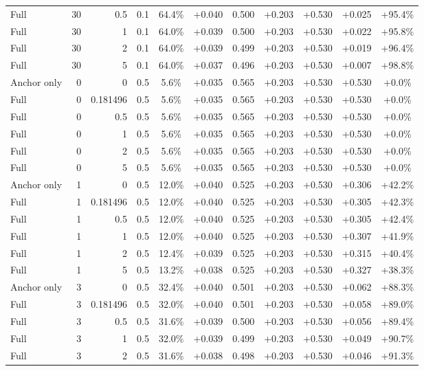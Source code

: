 \begin{table}[htbp]
\begin{tabular}{lrrrccccccc}
Full & 30 & 0.5 & 0.1 & 64.4\% & +0.040 & 0.500 & +0.203 & +0.530 & +0.025 & +95.4\% \\
Full & 30 & 1 & 0.1 & 64.0\% & +0.039 & 0.500 & +0.203 & +0.530 & +0.022 & +95.8\% \\
Full & 30 & 2 & 0.1 & 64.0\% & +0.039 & 0.499 & +0.203 & +0.530 & +0.019 & +96.4\% \\
Full & 30 & 5 & 0.1 & 64.0\% & +0.037 & 0.496 & +0.203 & +0.530 & +0.007 & +98.8\% \\
Anchor only & 0 & 0 & 0.5 & 5.6\% & +0.035 & 0.565 & +0.203 & +0.530 & +0.530 & +0.0\% \\
Full & 0 & 0.181496 & 0.5 & 5.6\% & +0.035 & 0.565 & +0.203 & +0.530 & +0.530 & +0.0\% \\
Full & 0 & 0.5 & 0.5 & 5.6\% & +0.035 & 0.565 & +0.203 & +0.530 & +0.530 & +0.0\% \\
Full & 0 & 1 & 0.5 & 5.6\% & +0.035 & 0.565 & +0.203 & +0.530 & +0.530 & +0.0\% \\
Full & 0 & 2 & 0.5 & 5.6\% & +0.035 & 0.565 & +0.203 & +0.530 & +0.530 & +0.0\% \\
Full & 0 & 5 & 0.5 & 5.6\% & +0.035 & 0.565 & +0.203 & +0.530 & +0.530 & +0.0\% \\
Anchor only & 1 & 0 & 0.5 & 12.0\% & +0.040 & 0.525 & +0.203 & +0.530 & +0.306 & +42.2\% \\
Full & 1 & 0.181496 & 0.5 & 12.0\% & +0.040 & 0.525 & +0.203 & +0.530 & +0.305 & +42.3\% \\
Full & 1 & 0.5 & 0.5 & 12.0\% & +0.040 & 0.525 & +0.203 & +0.530 & +0.305 & +42.4\% \\
Full & 1 & 1 & 0.5 & 12.0\% & +0.040 & 0.525 & +0.203 & +0.530 & +0.307 & +41.9\% \\
Full & 1 & 2 & 0.5 & 12.4\% & +0.039 & 0.525 & +0.203 & +0.530 & +0.315 & +40.4\% \\
Full & 1 & 5 & 0.5 & 13.2\% & +0.038 & 0.525 & +0.203 & +0.530 & +0.327 & +38.3\% \\
Anchor only & 3 & 0 & 0.5 & 32.4\% & +0.040 & 0.501 & +0.203 & +0.530 & +0.062 & +88.3\% \\
Full & 3 & 0.181496 & 0.5 & 32.0\% & +0.040 & 0.501 & +0.203 & +0.530 & +0.058 & +89.0\% \\
Full & 3 & 0.5 & 0.5 & 31.6\% & +0.039 & 0.500 & +0.203 & +0.530 & +0.056 & +89.4\% \\
Full & 3 & 1 & 0.5 & 32.0\% & +0.039 & 0.499 & +0.203 & +0.530 & +0.049 & +90.7\% \\
Full & 3 & 2 & 0.5 & 31.6\% & +0.038 & 0.498 & +0.203 & +0.530 & +0.046 & +91.3\% \\

\end{tabular}
\end{table}
